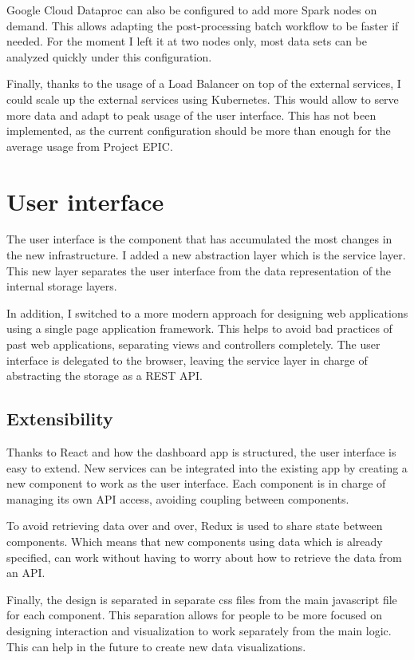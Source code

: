 Google Cloud Dataproc can also be configured to add more Spark nodes on demand. This allows adapting the post-processing batch workflow to be faster if needed. For the moment I left it at two nodes only, most data sets can be analyzed quickly under this configuration. 

Finally, thanks to the usage of a Load Balancer on top of the external services, I could scale up the external services using Kubernetes. This would allow to serve more data and adapt to peak usage of the user interface. This has not been implemented, as the current configuration should be more than enough for the average usage from Project EPIC.

\section{User interface}

The user interface is  the component that has accumulated the most changes in the new infrastructure. I added a new abstraction layer which is the service layer. This new layer separates the user interface from the data representation of the internal storage layers.

In addition, I switched to a more modern approach for designing web applications using a single page application framework. This helps to avoid bad practices of past web applications, separating views and controllers completely. The user interface is delegated to the browser, leaving the service layer in charge of abstracting the storage as a REST API. 

\subsection{Extensibility}

Thanks to React and how the dashboard app is structured, the user interface is easy to extend. New services can be integrated into the existing app by creating a new component to work as the user interface. Each component is in charge of managing its own API access, avoiding coupling between components.

To avoid retrieving data over and over, Redux is used to share state between components. Which means that new components using data which is already specified, can work without having to worry about how to retrieve the data from an API. 

Finally, the design is separated in separate css files from the main javascript file for each component. This separation allows for people to be more focused on designing interaction and visualization to work separately from the main logic. This can help in the future to create new data visualizations.

